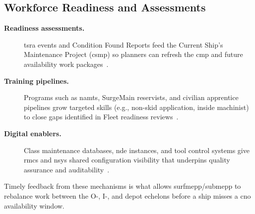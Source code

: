 \documentclass[../main.tex]{subfiles}
\begin{document}
\subsection{Workforce Readiness and Assessments}
\begin{description}
  \item[\textbf{Readiness assessments.}] \ac{tsra} events and Condition Found Reports feed the Current Ship's Maintenance Project (\ac{csmp}) so planners can refresh the \ac{cmp} and future availability work packages~\autocite{edo-4-1-1-fleet-maint-assets-2025}.
  \item[\textbf{Training pipelines.}] Programs such as \ac{namts}, SurgeMain reservists, and civilian apprentice pipelines grow targeted skills (e.g., non-skid application, inside machinist) to close gaps identified in Fleet readiness reviews~\autocite{edo-4-1-1-fleet-maint-assets-2025}.
  \item[\textbf{Digital enablers.}] Class maintenance databases, \ac{nde} instances, and tool control systems give \ac{rmc}s and \acp{nsy} shared configuration visibility that underpins quality assurance and auditability~\autocite{NAVSEAINST5450-145A}.
\end{description}
Timely feedback from these mechanisms is what allows \ac{surfmepp}/\ac{submepp} to rebalance work between the O-, I-, and depot echelons before a ship misses a \ac{cno} availability window.
\end{document}
